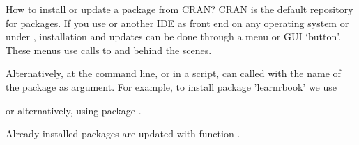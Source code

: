 \documentclass[krantz2]{krantz}\usepackage{knitr}
\begin{document}
\begin{faqbox}{How to install or update a package from CRAN?}
CRAN is the default repository for \Rlang packages. If you use \RStudio or another IDE as front end on any operating system or  under , installation and updates can be done through a menu or GUI `button'. These menus use calls to  and  behind the scenes.

Alternatively, at the \Rpgrm command line, or in a script,  can called with the name of the package as argument. For example, to install package ’learnrbook’ we use

\begin{knitrout}\footnotesize
{}\color{fgcolor}\begin{kframe}
\begin{alltt}
\hlstd{(}\hlstd{)}
\end{alltt}
\end{kframe}
\end{knitrout}

or alternatively, using package .

\begin{knitrout}\footnotesize
{}\color{fgcolor}\begin{kframe}
\begin{alltt}
\hlopt{::}\hlstd{(}\hlstd{)}
\end{alltt}
\end{kframe}
\end{knitrout}

Already installed packages are updated with function .
\end{faqbox}
\end{document}
